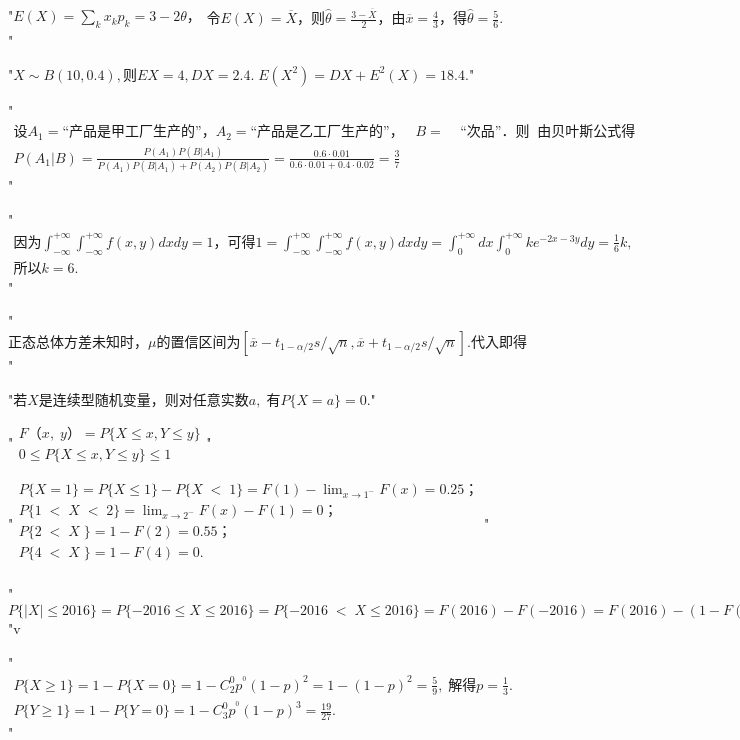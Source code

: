 "$E\left(X\right)=\sum_kx_kp_k=3-2\theta，\begin{array}{l}令E\left(X\right)=\overline X，\mathrm 则\widehat\theta=\frac{3-\overline X}2，由\overline x=\frac43，\mathrm 得\widehat\theta=\frac56.\end{array}$"


"$X\sim B(10,0.4),则EX=4,DX=2.4.\;E(X^2)=DX+E^2(X)=18.4.$"


"$\begin{array}{l}设A_1=“\mathrm{产品是甲工厂生产的}”，A_2=“\mathrm{产品是乙工厂生产的}”，\;\;\;B=\;\;\;\;“\mathrm{次品}”．则\;\;\mathrm{由贝叶斯公式得}\\P(A_1\vert B)=\frac{P(A_1)P(B\vert A_1)}{P(A_1)P(B\vert A_1)+P(A_2)P(B\vert A_2)}=\frac{0.6\cdot0.01}{0.6\cdot0.01+0.4\cdot0.02}=\frac37\end{array}$"


"$\begin{array}{l}\mathrm{因为}\int_{-\infty}^{+\infty}\int_{-\infty}^{+\infty}f(x,y)dxdy=1，\mathrm{可得}1=\int_{-\infty}^{+\infty}\int_{-\infty}^{+\infty}f(x,y)dxdy=\int_0^{+\infty}dx\int_0^{+\infty}ke^{-2x-3y}dy=\frac16k,\\\mathrm{所以}k=6.\end{array}$"


"$\mathrm{正态总体方差未知时}，\mu\mathrm{的置信区间为}\left[\overline x-t_{1-\alpha/2}s/\sqrt n,\overline x+t_{1-\alpha/2}s/\sqrt n\right].\mathrm{代入即得}$"


"$若X\mathrm{是连续型随机变量}，\mathrm{则对任意实数}a,\;有P\{X=a\}=0.$"


"$\begin{array}{l}F（x,\;y）=P\{X\leq x,Y\leq y\}\\0\leq P\{X\leq x,Y\leq y\}\leq1\end{array}$"


"$\begin{array}{l}P\{X=1\}=P\{X\leq1\}-P\{X\;<\;1\}=F(1)-\lim_{x\rightarrow1^-}F(x)=0.25；\\P\{1\;<\;X\;<\;2\}=\lim_{x\rightarrow2^-}F(x)-F(1)=0；\\P\{2\;<\;X\;\}=1-F(2)=0.55；\\P\{4\;<\;X\;\}=1-F(4)=0.\\\end{array}$"


"$P\{\vert X\vert\leq2016\}=P\{-2016\leq X\leq2016\}=P\{-2016\;<\;X\leq2016\}=F(2016)-F(-2016)=F(2016)-(1-F(2016))=2F(2016)-1$"v


"$\begin{array}{l}P\{X\geq1\}=1-P\{X=0\}=1-C_2^0p^{{}^0}(1-p)^2=1-(1-p)^2=\frac59,\;\mathrm{解得}p=\frac13.\\P\{Y\geq1\}=1-P\{Y=0\}=1-C_3^0p^{{}^0}(1-p)^3=\frac{19}{27}.\end{array}$"


